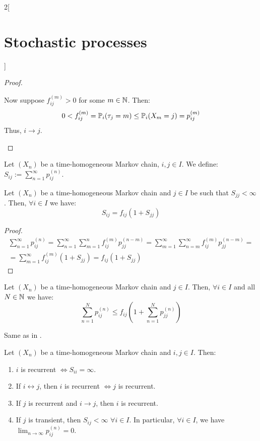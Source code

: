 \documentclass[../../../main_math.tex]{subfiles}
\begin{document}
\begin{multicols}{2}[\section{Stochastic processes}]
\begin{proof}
\begin{itemizeiff}
      \item Now suppose $f_{ij}^{(m)}>0$ for some $m\in\mathbb{N}$. Then:
      $$
        0<f_{ij}^{(m)}=\mathbb{P}_i(\tau_j=m)\leq \mathbb{P}_i(X_m=j)=p_{ij}^{(m)}
      $$
      Thus, $i\to j$.
    \end{itemizeiff}
  \end{proof}
  \begin{definition}
    Let $(X_n)$ be a time-homogeneous Markov chain, $i, j\in I$. We define: $S_{ij}:=\sum_{n=1}^{\infty}p_{ij}^{(n)}$.
  \end{definition}
  \begin{lemma}\label{SP:lemaPrerec}
    Let $(X_n)$ be a time-homogeneous Markov chain and $j\in I$ be such that $S_{jj}<\infty$. Then, $\forall i\in I$ we have:
    $$
      S_{ij}=f_{ij}(1+S_{jj})
    $$
  \end{lemma}
  \begin{proof}
    \begin{multline*}
      \sum_{n=1}^\infty p_{ij}^{(n)}= \sum_{n=1}^\infty \sum_{m=1}^n f_{ij}^{(m)}p_{jj}^{(n-m)}=\sum_{m=1}^\infty \sum_{n=m}^\infty f_{ij}^{(m)}p_{jj}^{(n-m)}=\\=\sum_{m=1}^\infty f_{ij}^{(m)}(1+S_{jj})=f_{ij}(1+S_{jj})
    \end{multline*}
  \end{proof}
  \begin{lemma}\label{SP:lemaPrerec2}
    Let $(X_n)$ be a time-homogeneous Markov chain and $j\in I$. Then, $\forall i\in I$ and all $N\in\mathbb{N}$ we have:
    $$
      \sum_{n=1}^Np_{ij}^{(n)}\leq f_{ij}\left(1+\sum_{n=1}^Np_{jj}^{(n)}\right)
    $$
  \end{lemma}
  \begin{sproof}
    Same as in .
  \end{sproof}
  \begin{theorem}\label{SP:thmRec}
    Let $(X_n)$ be a time-homogeneous Markov chain and $i,j\in I$. Then:
    \begin{enumerate}
      \item\label{SP:thmRecA} $i$ is recurrent $\iff S_{ii}=\infty$.
      \item\label{SP:thmRecB} If $i\leftrightarrow j$, then $i$ is recurrent $\iff j$ is recurrent.
      \item\label{SP:thmRecC} If $j$ is recurrent and $i\to j$, then $i$ is recurrent.
      \item\label{SP:thmRecD} If $j$ is transient, then $S_{ij}<\infty$ $\forall i\in I$. In particular, $\forall i\in I$, we have $\displaystyle \lim_{n\to\infty}p_{ij}^{(n)}=0$.

\end{enumerate}
\end{theorem}
\end{multicols}
\end{document}
